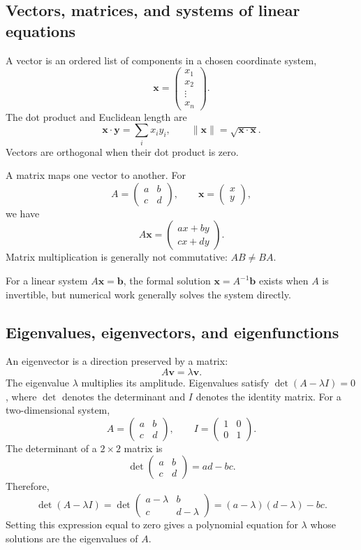 \subsection{Vectors, matrices, and systems of linear equations}
\label{math:linear}

A vector is an ordered list of components in a chosen coordinate system,
\[
    \mathbf{x}=\begin{pmatrix}x_1\\x_2\\\vdots\\x_n\end{pmatrix}.
\]
The dot product and Euclidean length are
\[
    \mathbf{x}\cdot\mathbf{y}=\sum_i x_i y_i, \qquad \lVert\mathbf{x}\rVert=\sqrt{\mathbf{x}\cdot\mathbf{x}}.
\]
Vectors are orthogonal when their dot product is zero.

A matrix maps one vector to another.
For
\[
    A=\begin{pmatrix}a&b\\c&d\end{pmatrix}, \qquad \mathbf{x}=\begin{pmatrix}x\\y\end{pmatrix},
\]
we have
\[
    A\mathbf{x}=\begin{pmatrix}ax+by\\cx+dy\end{pmatrix}.
\]
Matrix multiplication is generally not commutative: $AB\ne BA$.

For a linear system $A\mathbf{x}=\mathbf{b}$, the formal solution $\mathbf{x}=A^{-1}\mathbf{b}$ exists when $A$ is invertible, but numerical work generally solves the system directly.


\subsection{Eigenvalues, eigenvectors, and eigenfunctions}
\label{math:eigen}

An eigenvector is a direction preserved by a matrix:
\[
    A\mathbf{v}=\lambda\mathbf{v}.
\]
The eigenvalue $\lambda$ multiplies its amplitude.
Eigenvalues satisfy $\det(A-\lambda I)=0$, where $\det$ denotes the determinant and $I$ denotes the identity matrix.
For a two-dimensional system,
\[
    A=\begin{pmatrix}a&b\\c&d\end{pmatrix},
    \qquad
    I=\begin{pmatrix}1&0\\0&1\end{pmatrix}.
\]
The determinant of a $2\times2$ matrix is
\[
    \det\begin{pmatrix}a&b\\c&d\end{pmatrix}=ad-bc.
\]
Therefore,
\[
    \det(A-\lambda I)
    =
    \det\begin{pmatrix}a-\lambda&b\\c&d-\lambda\end{pmatrix}
    =
    (a-\lambda)(d-\lambda)-bc.
\]
Setting this expression equal to zero gives a polynomial equation for $\lambda$ whose solutions are the eigenvalues of $A$.

